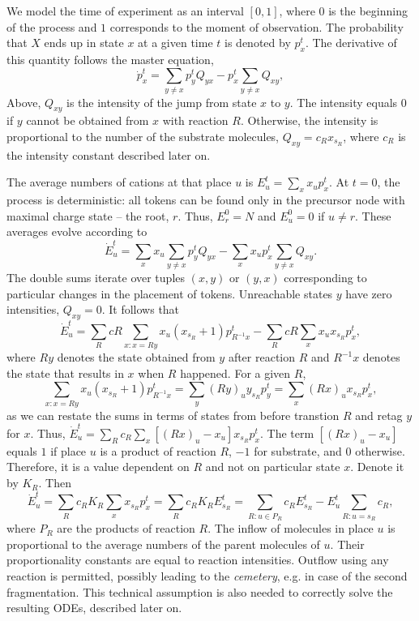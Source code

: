 \documentclass{llncs}
\begin{document}
We model the time of experiment as an interval $[0,1]$, where $0$ is the beginning of the process and $1$ corresponds to the moment of observation. The probability that $X$ ends up in state $x$ at a given time $t$ is denoted by $p_x^t$. The derivative of this quantity follows the master equation,
        $$\dot{p}_x^t = \sum_{y\not=x} p_y^t Q_{yx} - p_x^t \sum_{y\not=x} Q_{xy},$$
Above, $Q_{xy}$ is the intensity of the jump from state $x$ to $y$. The intensity equals $0$ if $y$ cannot be obtained from $x$ with reaction $R$. Otherwise, the intensity is proportional to the number of the substrate molecules, $Q_{xy}=c_R x_{s_R}$,  where $c_R$ is the intensity constant described later on.

The average numbers of cations at that place $u$ is $E_u^t= \sum_x x_up_x^t$.
At $t=0$, the process is deterministic: all tokens can be found only in the precursor node with maximal charge state -- the root, $r$.
Thus, $E_r^0=N$ and $E_u^0=0$ if $u \not= r$.
These averages evolve according to
        $$\dot E_u^t=\sum_x x_u \sum_{y\not=x} p_y^t Q_{yx} -\sum_x x_u p_x^t \sum_{y\not=x} Q_{xy}.$$
The double sums iterate over tuples $(x,y)$ or $(y,x)$ corresponding to particular changes in the placement of tokens.
Unreachable states $y$ have zero intensities, $Q_{xy} = 0$.
It follows that
        $$\dot E_u^t = \sum_R cR \sum_{x:x=Ry}  x_u (x_{s_R}+1) p_{R^{-1}x}^t- \sum_R cR \sum_{x} x_u x_{s_R} p_x^t,$$
where $Ry$ denotes the state obtained from $y$ after reaction $R$ and $R^{-1}x$ denotes the state that results in $x$ when $R$ happened. For a given $R$,
        $$\sum_{x:x=Ry} x_u (x_{s_R}+1) p_{R^{-1}x}^t = \sum_{y}  (Ry)_u y_{s_R} p_y^t = \sum_x (Rx)_u x_{s_R} p_x^t,$$
as we can restate the sums in terms of states from before transtion $R$ and retag $y$ for $x$.
Thus, $\dot E_u^t = \sum_R c_R \sum_x   \left[(Rx)_u-x_u \right] x_{s_R} p_x^t$. The term $\left[(Rx)_u-x_u\right]$ equals $1$ if place $u$ is a product of reaction $R$, $-1$ for substrate, and $0$ otherwise.
Therefore, it is a value dependent on $R$ and not on particular state $x$.
Denote it by $K_R$.
Then
        $$\dot E_u^t = \sum_R c_R K_R \sum_x x_{s_R} p_x^t = \sum_R c_R K_R E_{s_R}^t = \sum_{R:u\in P_R} c_R E_{s_R}^t - E_u^t \sum_{R: u=s_R}c_R,$$
where $P_R$ are the products of reaction $R$.
The inflow of molecules in place $u$ is proportional to the average numbers of the parent molecules of $u$.
Their proportionality constants are equal to reaction intensities.
Outflow using any reaction is permitted, possibly leading to the \textit{cemetery}, e.g. in case of the second fragmentation. This technical assumption is also needed to correctly solve the resulting ODEs, described later on.
\end{document}
